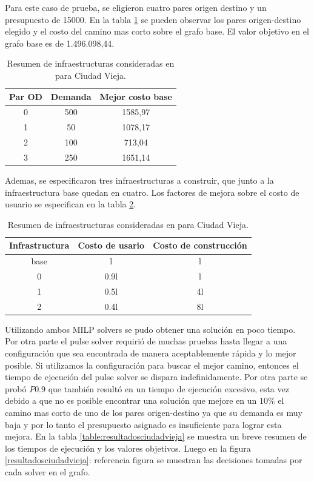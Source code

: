 \documentclass{article}
\begin{document}
  Para este caso de prueba, se eligieron cuatro pares origen destino y un presupuesto de 15000. En la tabla \ref{table:odsciudadvieja} se pueden observar los pares origen-destino elegido y el costo del camino mas corto sobre el grafo base. El valor objetivo en el grafo base es de 1.496.098,44.

  \begin{table}[h!]
    \centering
    \begin{tabular}{ccc}
      \toprule
      Par OD & Demanda & Mejor costo base \\
      \midrule
      0 & 500 & 1585,97 \\
      1 & 50 & 1078,17 \\
      2 & 100 & 713,04 \\
      3 & 250 & 1651,14 \\
      \bottomrule
    \end{tabular}
    \caption{Resumen de infraestructuras consideradas en para Ciudad Vieja.}\label{table:odsciudadvieja}
  \end{table}
  
  Ademas, se especificaron tres infraestructuras a construir, que junto a la infraestructura base quedan en cuatro. Los factores de mejora sobre el costo de usuario se especifican en la tabla \ref{table:infrasciudadvieja}.

  \begin{table}[h!]
    \centering
    \begin{tabular}{ccc}
      \toprule
      Infrastructura & Costo de usario & Costo de construcción \\
      \midrule
      base & l & l \\
      0 & 0.9l & l \\
      1 & 0.5l & 4l \\
      2 & 0.4l & 8l \\
      \bottomrule
    \end{tabular}
    \caption{Resumen de infraestructuras consideradas en para Ciudad Vieja.}\label{table:infrasciudadvieja}
  \end{table}

  Utilizando ambos MILP solvers se pudo obtener una solución en poco tiempo. Por otra parte el pulse solver requirió de muchas pruebas hasta llegar a una configuración que sea encontrada de manera aceptablemente rápida y lo mejor posible. Si utilizamos la configuración para buscar el mejor camino, entonces el tiempo de ejecución del pulse solver se dispara indefinidamente. Por otra parte se probó $P0.9$ que también resultó en un tiempo de ejecución excesivo, esta vez debido a que no es posible encontrar una solución que mejore en un $10\%$ el camino mas corto de uno de los pares origen-destino ya que su demanda es muy baja y por lo tanto el presupuesto asignado es insuficiente para lograr esta mejora. En la tabla \ref{table:resultadosciudadvieja} se muestra un breve resumen de los tiempos de ejecución y los valores objetivos. Luego en la figura \ref{resultadosciudadvieja}: referencia figura se muestran las decisiones tomadas por cada solver en el grafo.
\end{document}
